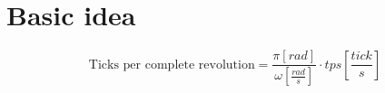 \section{Basic idea}

\begin{equation}
  \text{Ticks per complete revolution} = \frac{\pi [rad]}{\omega [\frac{rad}{s}]} \cdot tps [\frac{tick}{s}]
\end{equation}
